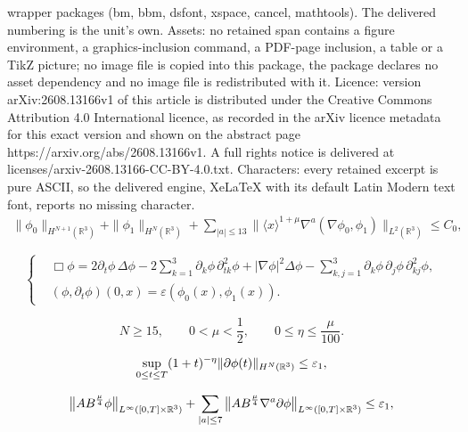\documentclass[10pt,a4paper]{amsart}
\def\R{\mathop{\mathbb R\kern 0pt}\nolimits}
\def\f{\frac}
\def\na{\nabla}
\def\p{\partial}
\def\ve{\varepsilon}
\begin{document}
wrapper packages (bm, bbm, dsfont, xspace, cancel, mathtools). The delivered numbering is the unit's own. Assets: no retained span contains a figure environment, a graphics-inclusion command, a PDF-page inclusion, a table or a TikZ picture; no image file is copied into this package, the package declares no asset dependency and no image file is redistributed with it. Licence: version arXiv:2608.13166v1 of this article is distributed under the Creative Commons Attribution 4.0 International licence, as recorded in the arXiv licence metadata for this exact version and shown on the abstract page https://arxiv.org/abs/2608.13166v1. A full rights notice is delivered at licenses/arxiv-2608.13166-CC-BY-4.0.txt. Characters: every retained excerpt is pure ASCII, so the delivered engine, XeLaTeX with its default Latin Modern text font, reports no missing character.
\begin{equation}\label{YHC-4}
\begin{split}
\|\phi_0\|_{H^{N+1}(\mathbb{R}^3)}+\|\phi_1\|_{H^{N}(\mathbb{R}^3)} + \sum_{|a|\le 13} \|\langle x\rangle^{1+\mu} \nabla^a(\na\phi_0,\phi_1)\|_{L^2(\mathbb{R}^3)} \le C_0,
\end{split}
\end{equation}

\begin{equation}\label{eq:Chaplygin-Cauchy}
\left\{
\begin{aligned}
&\Box\phi=2\partial_t\phi\,\Delta\phi-
2\sum_{k=1}^3\partial_k\phi\,\partial^2_{tk}\phi+
|\nabla\phi|^2\Delta\phi-\sum_{k,j=1}^3\partial_k\phi\,\partial_j\phi\,\partial^2_{kj}\phi,\\
&(\phi, \partial_t\phi)(0,x)=\ve(\phi_0(x),\phi_1(x)).
\end{aligned}
\right.
\end{equation}

		\begin{equation}
		\label{eq:CVP-bootstrap-parameter-range}
		N \ge 15,
		\qquad
		0<\mu<\frac12,
		\qquad
		0\le\eta\le\frac{\mu}{100}.
	\end{equation}

	\begin{equation}
		\label{eq:CVP-bootstrap-energy-ordinary}
		\sup_{0\le t\le T}
		(1+t)^{-\eta}
		\|\p\phi(t)\|_{H^N(\R^3)}
		\le
		\ve_1,
	\end{equation}

	\begin{equation}\label{eq:CVP-bootstrap-pointwise-phi}
		\big\|
		AB^{\f\mu4}\phi
		\big\|_{L^\infty([0,T]\times\R^3)}
		+
		\sum_{|a|\le 7}
		\big\|
		AB^{\f\mu4}\nabla^a\p\phi
		\big\|_{L^\infty([0,T]\times\R^3)}
		\le
		\ve_1,
	\end{equation}
\end{document}
